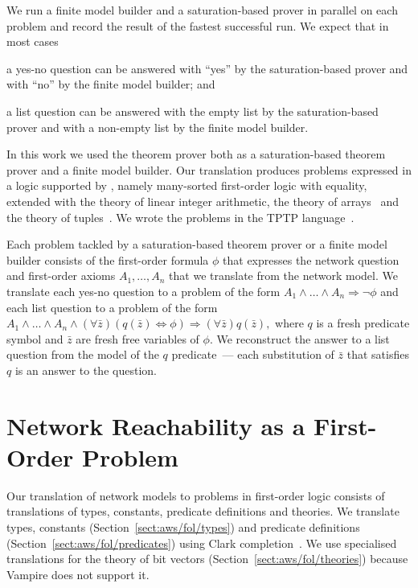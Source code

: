
We run a finite model builder and a saturation-based prover in parallel on each problem and record the result of the fastest successful run. We expect that in most cases
\begin{enumerate*}[label=(\roman*)]
  \item a yes-no question can be answered with ``yes'' by the saturation-based prover and with ``no'' by the finite model builder; and
  \item a list question can be answered with the empty list by the saturation-based prover and with a non-empty list by the finite model builder.
\end{enumerate*}

In this work we used the \vampire theorem prover both as a saturation-based theorem prover and a finite model builder. Our translation produces problems expressed in a logic supported by \vampire, namely many-sorted first-order logic with equality, extended with the theory of linear integer arithmetic, the theory of arrays~\cite{VampireAndFOOL} and the theory of tuples~\cite{KKV18}. We wrote the problems in the TPTP language~\cite{TPTP}.

Each problem tackled by a saturation-based theorem prover or a finite model builder consists of the first-order formula $\phi$ that expresses the network question and first-order axioms $A_1,\ldots,A_n$ that we translate from the network model. We translate each yes-no question to a problem of the form $A_1\wedge\ldots\wedge A_n \Rightarrow \neg\phi$ and each list question to a problem of the form $A_1\wedge\ldots\wedge A_n \wedge (\forall \bar{z})(q(\bar{z})\Leftrightarrow \phi) \Rightarrow (\forall \bar{z})q(\bar{z}),$ where $q$ is a fresh predicate symbol and $\bar{z}$ are fresh free variables of $\phi$. We reconstruct the answer to a list question from the model of the $q$ predicate~--- each substitution of $\bar{z}$ that satisfies $q$ is an answer to the question.

\section{Network Reachability as a First-Order Problem}\label{sect:aws/fol}
Our translation of network models to problems in first-order logic consists of translations of types, constants, predicate definitions and theories. We translate types, constants (Section~\ref{sect:aws/fol/types}) and predicate definitions (Section~\ref{sect:aws/fol/predicates}) using Clark completion~\cite{DBLP:conf/adbt/Clark77}. We use specialised translations for the theory of bit vectors (Section~\ref{sect:aws/fol/theories}) because Vampire does not support it.

